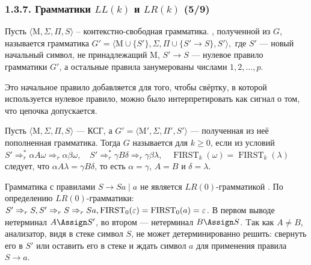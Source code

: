 \begin{frame}
\frametitle{1.3.7. Грамматики $LL(k)$ и $LR(k)$ (5/9)}
Пусть $\langle \mathrm{M}, \Sigma, \Pi, S \rangle$ -- контекстно-свободная грамматика. 
, полученной из $G$, называется грамматика 
$
G' = \langle \mathrm{M} \cup \{ S' \}, \Sigma, \Pi \cup \{ S' \to S \}, S' \rangle,
$
где $S'$ --- новый начальный символ, не принадлежащий $\mathrm{M}$, $S' \to S$ --- нулевое правило грамматики $G'$, 
а остальные правила занумерованы числами $1, 2, \ldots, p$. 
\begin{remark} Это начальное правило добавляется для того, чтобы свёртку, в которой 
используется нулевое правило, можно было интерпретировать как сигнал о том, 
что цепочка допускается.
\end{remark}

Пусть $\langle \mathrm{M}, \Sigma, \Pi, S \rangle$ --- КСГ, 
а $G' = \langle \mathrm{M}', \Sigma, \Pi', S'\rangle $ --- полученная из неё пополненная грамматика. Тогда 
$G$ называется  для $k \ge 0$, 
если из условий\\
$
S' \Rightarrow^*_{r} \alpha A \omega \Rightarrow_{r} \alpha \beta \omega,\quad
S' \Rightarrow^*_{r} \gamma B \delta \Rightarrow_{r} \gamma \beta \lambda, \quad
\operatorname{FIRST}_k(\omega) = \operatorname{FIRST}_k(\lambda)
$
следует, что $\alpha A \lambda = \gamma B \delta$, то есть $\alpha = \gamma$, $A = B$ и $\delta = \lambda$.
\begin{example}
Грамматика с правилами \(S \to Sa \mid a \) не  является  \(LR(0)\)-грамматикой . 
По определению \(LR(0)\)-грамматики: 
\(
S' \Rightarrow_{r}S, \space
S' \Rightarrow_{r}S \Rightarrow_{r}Sa, \space
\operatorname{FIRST}_0(\varepsilon) = \operatorname{FIRST}_0(a) = \varepsilon
\).
В первом выводе нетерминал $A \Assign S'$, во втором --- нетерминал $B \Assign S$. Tак как $A \neq B$, анализатор, видя в стеке символ $S$, не может детерминированно решить: свернуть его в $S'$ или
оставить его в стеке и ждать символ $a$ для применения правила \(S \to a \).
\end{example}
\end{frame}

